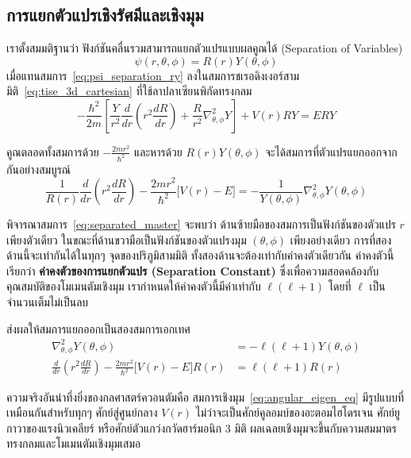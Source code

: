 \subsection{การแยกตัวแปรเชิงรัศมีและเชิงมุม}
เราตั้งสมมติฐานว่า ฟังก์ชันคลื่นรวมสามารถแยกตัวแปรแบบผลคูณได้ (Separation of Variables)
\begin{equation}
\psi(r, \theta, \phi) = R(r) Y(\theta, \phi)
\label{eq:psi_separation_ry}
\end{equation}
เมื่อแทนสมการ~\eqref{eq:psi_separation_ry} ลงในสมการชเรอดิงเงอร์สามมิติ~\eqref{eq:tise_3d_cartesian} ที่ใช้ลาปลาเซียนพิกัดทรงกลม
\begin{equation}
-\frac{\hbar^2}{2m} \left[ \frac{Y}{r^2} \frac{d}{dr}\left( r^2 \frac{dR}{dr} \right) + \frac{R}{r^2} \nabla_{\theta, \phi}^2 Y \right] + V(r) R Y = E R Y
\end{equation}

คูณตลอดทั้งสมการด้วย $-\frac{2mr^2}{\hbar^2}$ และหารด้วย $R(r)Y(\theta, \phi)$ จะได้สมการที่ตัวแปรแยกออกจากกันอย่างสมบูรณ์
\begin{equation}
\frac{1}{R(r)} \frac{d}{dr}\left( r^2 \frac{dR}{dr} \right) - \frac{2m r^2}{\hbar^2}\big[ V(r) - E \big] = -\frac{1}{Y(\theta, \phi)} \nabla_{\theta, \phi}^2 Y(\theta, \phi)
\label{eq:separated_master}
\end{equation}

พิจารณาสมการ~\eqref{eq:separated_master} จะพบว่า ด้านซ้ายมือของสมการเป็นฟังก์ชันของตัวแปร $r$ เพียงตัวเดียว ในขณะที่ด้านขวามือเป็นฟังก์ชันของตัวแปรงมุม $(\theta, \phi)$ เพียงอย่างเดียว การที่สองด้านนี้จะเท่ากันได้ในทุกๆ จุดของปริภูมิสามมิติ ทั้งสองด้านจะต้องเท่ากับค่าคงตัวเดียวกัน ค่าคงตัวนี้เรียกว่า \textbf{ค่าคงตัวของการแยกตัวแปร (Separation Constant)} ซึ่งเพื่อความสอดคล้องกับคุณสมบัติของโมเมนตัมเชิงมุม เรากำหนดให้ค่าคงตัวนี้มีค่าเท่ากับ $\ell(\ell + 1)$ โดยที่ $\ell$ เป็นจำนวนเต็มไม่เป็นลบ

ส่งผลให้สมการแยกออกเป็นสองสมการเอกเทศ
\begin{align}
\nabla_{\theta, \phi}^2 Y(\theta, \phi) &= -\ell(\ell + 1) Y(\theta, \phi) \label{eq:angular_eigen_eq} \\
\frac{d}{dr}\left( r^2 \frac{dR}{dr} \right) - \frac{2m r^2}{\hbar^2}\big[ V(r) - E \big] R(r) &= \ell(\ell + 1) R(r) \label{eq:radial_general_eq}
\end{align}

ความจริงอันน่าทึ่งยิ่งของกลศาสตร์ควอนตัมคือ สมการเชิงมุม~\eqref{eq:angular_eigen_eq} มีรูปแบบที่เหมือนกันสำหรับทุกๆ ศักย์สู่ศูนย์กลาง $V(r)$ ไม่ว่าจะเป็นศักย์คูลอมบ์ของอะตอมไฮโดรเจน ศักย์ยูกาวาของแรงนิวเคลียร์ หรือศักย์ตัวแกว่งกวัดฮาร์มอนิก 3 มิติ ผลเฉลยเชิงมุมจะขึ้นกับความสมมาตรทรงกลมและโมเมนตัมเชิงมุมเสมอ

